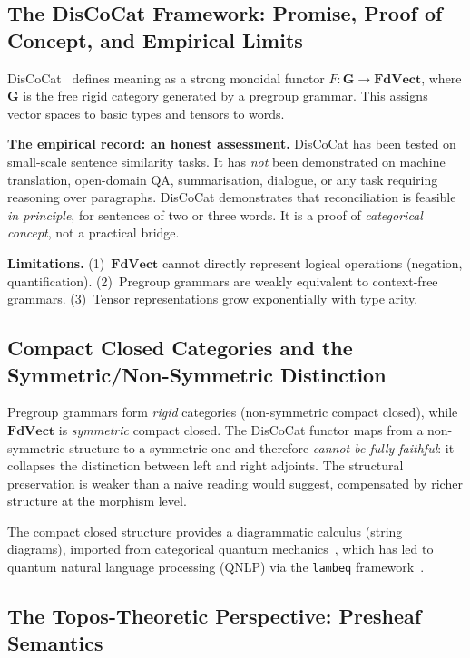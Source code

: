 \documentclass[12pt,a4paper]{article}
\begin{document}
\subsection{The DisCoCat Framework: Promise, Proof of Concept, and Empirical Limits}

DisCoCat~\cite{CoeckeSadrzadehClark2010} defines meaning as a strong monoidal
functor $F \colon \mathbf{G} \to \mathbf{FdVect}$, where $\mathbf{G}$ is the
free rigid category generated by a pregroup grammar. This assigns vector
spaces to basic types and tensors to words.

\textbf{The empirical record: an honest assessment.} DisCoCat has been tested
on small-scale sentence similarity tasks. It has \emph{not} been demonstrated
on machine translation, open-domain QA, summarisation, dialogue, or any task
requiring reasoning over paragraphs. DisCoCat demonstrates that
reconciliation is feasible \emph{in principle}, for sentences of two or three
words. It is a proof of \emph{categorical concept}, not a practical bridge.

\textbf{Limitations.} (1)~$\mathbf{FdVect}$ cannot directly represent logical
operations (negation, quantification). (2)~Pregroup grammars are weakly
equivalent to context-free grammars. (3)~Tensor representations grow
exponentially with type arity.

\subsection{Compact Closed Categories and the Symmetric/Non-Symmetric Distinction}

Pregroup grammars form \emph{rigid} categories (non-symmetric compact closed),
while $\mathbf{FdVect}$ is \emph{symmetric} compact closed. The DisCoCat
functor maps from a non-symmetric structure to a symmetric one and therefore
\emph{cannot be fully faithful}: it collapses the distinction between left and
right adjoints. The structural preservation is weaker than a naive reading
would suggest, compensated by richer structure at the morphism level.

The compact closed structure provides a diagrammatic calculus (string
diagrams), imported from categorical quantum
mechanics~\cite{AbramskyCoecke2004}, which has led to quantum natural language
processing (QNLP) via the \texttt{lambeq} framework~\cite{Kartsaklis2021}.

\subsection{The Topos-Theoretic Perspective: Presheaf Semantics}
\end{document}

